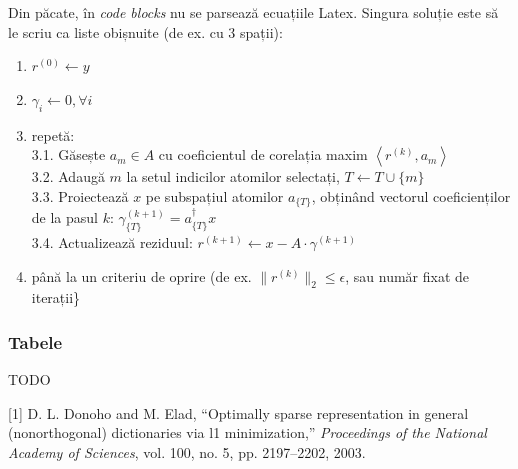 \documentclass[]{article}
\providecommand{\tightlist}{%
  \setlength{\itemsep}{0pt}\setlength{\parskip}{0pt}}
\begin{document}
Din păcate, în \emph{code blocks} nu se parsează ecuațiile Latex.
Singura soluție este să le scriu ca liste obișnuite (de ex. cu 3
spații):

\begin{enumerate}
\def\labelenumi{\arabic{enumi}.}
\tightlist
\item
  \(r^{(0)} \leftarrow y\)
\item
  \(\gamma_i \leftarrow 0, \forall i\)
\item
  repetă:\\
   3.1. Găsește \(a_m \in A\) cu coeficientul de corelația maxim
  \(\left\langle r^{(k)}, a_m \right\rangle\)\\
   3.2. Adaugă \(m\) la setul indicilor atomilor selectați,
  \(T \leftarrow T \cup \{m\}\)\\
   3.3. Proiectează \(x\) pe subspațiul atomilor \(a_{\{T\}}\), obținând
  vectorul coeficienților de la pasul \(k\):
  \(\gamma_{\{T\}}^{(k+1)} = a_{\{T\}}^{\dagger} x\)\\
   3.4. Actualizează reziduul:
  \(r^{(k+1)} \leftarrow x - A \cdot \gamma^{(k+1)}\)
\item
  până la un criteriu de oprire (de ex. \(\|r^{(k)}\|_2 \le \epsilon\),
  sau număr fixat de iterații\}
\end{enumerate}

\subsubsection{Tabele}\label{tabele}

TODO

\hypertarget{refs}{}
\hypertarget{ref-OptimSpReprDonoho2003}{}
{[}1{]} D. L. Donoho and M. Elad, ``Optimally sparse representation in
general (nonorthogonal) dictionaries via l1 minimization,''
\emph{Proceedings of the National Academy of Sciences}, vol. 100, no. 5,
pp. 2197--2202, 2003.
\end{document}
